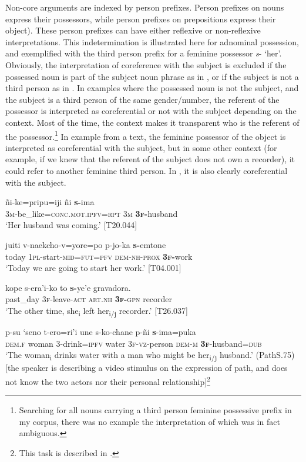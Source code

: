 \documentclass[output=paper]{langscibook}
\begin{document}
Non-core arguments are indexed by person prefixes. Person prefixes on nouns express their possessors, while person prefixes on prepositions express their object). These person prefixes can have either reflexive or non-reflexive interpretations. This indetermination is illustrated here for adnominal possession, and exemplified with the third person prefix for a feminine possessor \textit{s}- ‘her’. Obviously, the interpretation of coreference with the subject is excluded if the possessed noun is part of the subject noun phrase as in , or if the subject is not a third person as in . In examples where the possessed noun is not the subject, and the subject is a third person of the same gender/number, the referent of the possessor is interpreted as coreferential or not with the subject depending on the context. Most of the time, the context makes it transparent who is the referent of the possessor.\footnote{Searching for all nouns carrying a third person feminine possessive prefix in my corpus, there was no example the interpretation of which was in fact ambiguous.} In example  from a text, the feminine possessor of the object is interpreted as coreferential with the subject, but in some other context (for example, if we knew that the referent of the subject does not own a recorder), it could refer to another feminine third person. In , it is also clearly coreferential with the subject.


\ea
\label{ex:Rose:20}
\gll ñi-ke=pripu=iji ñi \textbf{s-}ima\\
3\textsc{m}-be\_like=\textsc{conc.mot.ipfv=rpt} \textsc{3m} \textsc{\textbf{3f}}\textbf{-}husband\\
\glt ‘Her husband was coming.’ [T20.044]
\z

\ea
\label{ex:Rose:21}
\gll juiti v-naekcho-v=yore=po p-jo-ka \textbf{s-}emtone \\
today 1\textsc{pl}-start-\textsc{mid=fut=pfv} \textsc{dem-nh-prox} \textsc{\textbf{3f}}\textbf{-}work\\
\glt ‘Today we are going to start her work.’ [T04.001]
\z

\ea
\label{ex:Rose:22}
\gll kope s-era'i-ko to \textbf{s-}ye'e gravadora.\\
past\_day 3\textsc{f}-leave-\textsc{act} \textsc{art.nh} \textsc{\textbf{3f-}gpn} recorder\\
\glt ‘The other time, she\textsubscript{i} left her\textsubscript{i/j} recorder.’ [T26.037]
\z

\ea
\label{ex:Rose:23}
\gll p-su `seno t-ero=ri'i une s-ko-chane p-ñi \textbf{s}-ima=puka\\
\textsc{dem.f} woman 3-drink=\textsc{ipfv} water \textsc{3f-vz}-person \textsc{dem-m} \textsc{\textbf{3f}}-husband=\textsc{dub}\\
\glt ‘The woman\textsubscript{i} drinks water with a man who might be her\textsubscript{i/j} husband.’ (PathS.75) [the speaker is describing a video stimulus on the expression of path, and does not know the two actors nor their personal relationship]\footnote{This task is described in \citet{VuillermetKopecka2019}.}
\z
\end{document}

